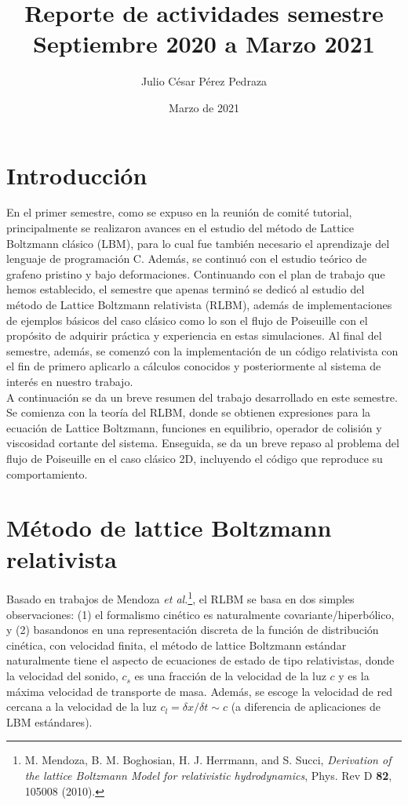 \documentclass{article}
\title{Reporte de actividades semestre Septiembre 2020 a Marzo 2021}
\author{Julio César Pérez Pedraza}
\date{Marzo de 2021}
\begin{document}
\maketitle

\section{Introducción}
En el primer semestre, como se expuso en la reunión de comité tutorial, principalmente se realizaron avances en el estudio del método de Lattice Boltzmann clásico (LBM), para lo cual fue también necesario el aprendizaje del lenguaje de programación C. Además, se continuó con el estudio teórico de grafeno pristino y bajo deformaciones. Continuando con el plan de trabajo que hemos establecido, el semestre que apenas terminó se dedicó al estudio del método de Lattice Boltzmann relativista (RLBM), además de implementaciones de ejemplos básicos del caso clásico como lo son el flujo de Poiseuille con el propósito de adquirir práctica y experiencia en estas simulaciones. Al final del semestre, además, se comenzó con la implementación de un código relativista con el fin de primero aplicarlo a cálculos conocidos y posteriormente al sistema de interés en nuestro trabajo.\\

A continuación se da un breve resumen del trabajo desarrollado en este semestre. Se comienza con la teoría del RLBM, donde se obtienen expresiones para la ecuación de Lattice Boltzmann, funciones en equilibrio, operador de colisión y viscosidad cortante del sistema. Enseguida, se da un breve repaso al problema del flujo de Poiseuille en el caso clásico 2D, incluyendo el código que reproduce su comportamiento.

\section{Método de lattice Boltzmann relativista}
Basado en trabajos de Mendoza \textit{et al.}\footnote{M. Mendoza, B. M. Boghosian, H. J. Herrmann, and S. Succi, \textit{Derivation of the lattice Boltzmann Model for relativistic hydrodynamics}, Phys. Rev D \textbf{82}, 105008 (2010).}, el RLBM se basa en dos simples observaciones: (1) el formalismo cinético es naturalmente covariante/hiperbólico, y (2) basandonos en una representación discreta de la función de distribución cinética, con velocidad finita, el método de lattice Boltzmann estándar naturalmente tiene el aspecto de ecuaciones de estado de tipo relativistas, donde la velocidad del sonido, $c_s$ es una fracción de la velocidad de la luz $c$ y es la máxima velocidad de transporte de masa. Además, se escoge la velocidad de red cercana a la velocidad de la luz $c_l=\delta x / \delta t \sim c$ (a diferencia de aplicaciones de LBM estándares).\\
\end{document}
